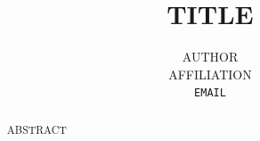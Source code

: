 \documentclass{article}
\title{TITLE}
\author{%
  AUTHOR \\
  AFFILIATION \\
  \texttt{EMAIL} \\
}
\begin{document}
\maketitle

\begin{abstract}
  ABSTRACT
\end{abstract}


\begin{ack}
\end{ack}




\end{document}
